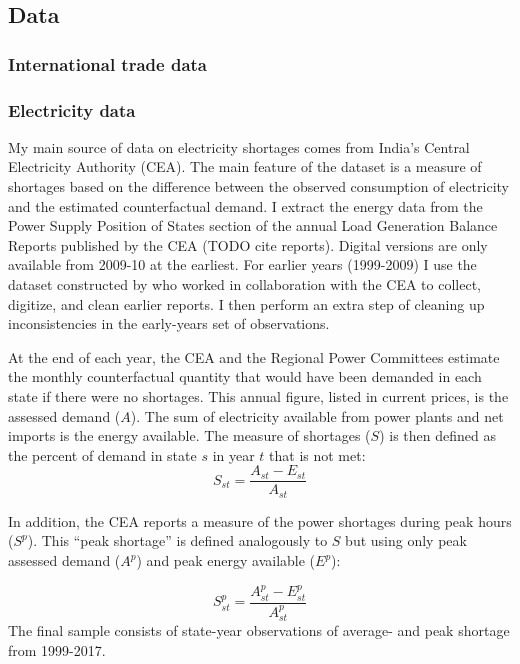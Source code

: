 \documentclass[11pt]{article}
\begin{document}
\subsection{Data}%
\label{sub:data}

\subsubsection{International trade data}%
\label{sub:international_trade_data}



\subsubsection{Electricity data}%
\label{sub:energy_data}

My main source of data on electricity shortages comes from India's Central Electricity Authority (CEA). The main feature of the dataset is a measure of shortages based on the difference between the observed consumption of electricity and the estimated counterfactual demand. I extract the energy data from the Power Supply Position of States section of the annual Load Generation Balance Reports published by the CEA (TODO cite reports). Digital versions are only available from 2009-10 at the earliest. For earlier years (1999-2009) I use the dataset constructed by \cite{allcott_how_2016} who worked in collaboration with the CEA to collect, digitize, and clean earlier reports. I then perform an extra step of cleaning up inconsistencies in the early-years set of observations. 

At the end of each year, the CEA and the Regional Power Committees estimate the monthly counterfactual quantity that would have been demanded in each state if there were no shortages. This annual figure, listed in current prices, is the assessed demand (\(A\)). The sum of electricity available from power plants and net imports is the energy available. The measure of shortages (\(S\)) is then defined as the percent of demand in state \(s\) in year \(t\) that is not met:
\[
S_{st} = \frac{A_{st} - E_{st} }{A_{st}}
\]

In addition, the CEA reports a measure of the power shortages during peak hours (\(S^p\)). This ``peak shortage'' is defined analogously to \(S\) but using only peak assessed demand (\(A^{p}\)) and peak energy available (\(E^p\)):

\[
S^{p}_{st} = \frac{A^{p}_{st} - E^{p}_{st}}{A^{p}_{st}}
\]
The final sample consists of state-year observations of average- and peak shortage from 1999-2017.
\end{document}
